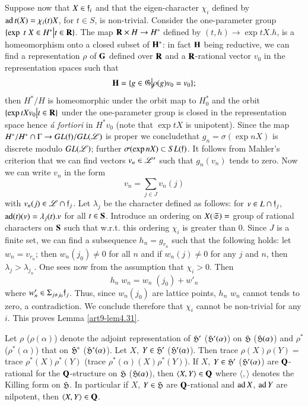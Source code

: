 \subsection{}\label{art9-subsec4.33}
Suppose now that $X \in \mathfrak{f}_i$ and that the eigen-character $\chi_i$ defined by $\operatorname{ad} t (X) = \chi_i(t) X$, for $t \in S$, is non-trivial. Consider the one-parameter group $\{\exp \; t\; X \in H^\ast \big| t \in \mathbf{R}\}$. The map $\mathbf{R} \times H \to H^\ast$ defined by $(t, h) \to \exp t X. h$, is a homeomorphism onto a closed subset of $\mathbf{H}^\ast$: in fact $\mathbf{H}$ being reductive, we can find a representation $\rho$ of $\mathbf{G}$ defined over $\mathbf{R}$ and a $\mathbf{R}$-rational vector $v_0$ in the representation spaces such that 
$$
\mathbf{H} = \{g \in \mathfrak{G} \big| \rho (g) v_0 = v_0\};
$$
then $H^\ast/ H$ is homeomorphic under the orbit map to $H^\ast_0$ and the orbit $\{\exp t X v_0 \big| t \in \mathbf{R}\}$ under the one-parameter group is closed in the representation space hence \textit{\'a fortiori} in $H^\ast v_0$  (note that $\exp t X$ is unipotent). Since the map $H^\ast/H^\ast \cap \Gamma \to G L (\mathfrak{f})/ GL (\mathscr{L})$ is proper we conclude\pageoriginale that $g_n = \sigma (\exp n X)$ is discrete modulo $GL(\mathscr{L})$; further $\sigma (\exp n X) \subset SL (\mathfrak{f})$. It follows from Mahler's criterion that we can find vectors $v_n \in \mathscr{L}'$ such that $g_n (v_n)$ tends to zero. Now we can write $v_n$ in the form
$$
v_n = \sum\limits_{j \in J} v_n (j)
$$
with $v_n(j) \in \mathscr{L} \cap \mathfrak{f}_j$. Let $\lambda_j$ be the character defined as follows: for $v \in L \cap \mathfrak{f}_j$, $\operatorname{ad} (t) (v) = \lambda_j (t).v$ for all $t \in \mathbf{S}$. Introduce an ordering on $X (\mathfrak{S}) =$ group of rational characters on $\mathbf{S}$ such that w.r.t. this ordering $\chi_i$ is greater than 0. Since $J$ is a finite set, we can find a subsequence $h_n = g_{r_n}$ such that the following holds: let $w_n = v_{r_n}$; then $w_n (j_0) \neq 0 $ for all $n$ and if $w_n (j)\neq 0$ for any $j$ and $n$, then $\lambda_j > \lambda_{j_n}$. One sees now from the assumption that $\chi_i >0$. Then 
$$
h_n \;w_n = w_n \;(j_0) + w'_n
$$
where $w'_n \in \Sigma_{j \neq j_0} \mathfrak{f}_j$. Thus, since $w_n (j_0)$ are lattice points, $h_n$ $w_n$ cannot tends to zero, a contradiction. We conclude therefore that $\chi_i$ cannot be non-trivial for any $i$. This proves Lemma \ref{art9-lem4.31}.

\setcounter{definition}{33}
\begin{coro}\label{art9-coro4.34}
Let $\rho$ (\resp $\rho (\alpha)$) denote the adjoint representation of $\mathfrak{H}'$ (\resp $\mathfrak{H}' (\alpha)$) on $\mathfrak{H}$ (\resp $\mathfrak{H}(\alpha)$) and $\rho^\ast$ (\resp $\rho^\ast (\alpha)$) that on $\mathfrak{H}^\ast$ (\resp $\mathfrak{H}^\ast(\alpha)$). Let $X$, $Y \in \mathfrak{H}'$ (\resp $\mathfrak{H}'(\alpha)$). Then trace $\rho (X) \rho (Y)=$ trace $\rho^\ast (X) \rho^\ast (Y)$ (\resp trace $\rho^\ast (\alpha) (X) \rho^\ast (Y)$). If $X$, $Y \in \mathfrak{H}'$ (\resp $\mathfrak{H}'(\alpha)$) are $\mathbf{Q}$-rational for the $\mathbf{Q}$-structure on $\mathfrak{H}$ (\resp $\mathfrak{H} (\alpha)$), then $\langle X,Y \rangle \in \mathbf{Q}$ where $\langle ,\rangle$ denotes the Killing form on $\mathfrak{H}$. In particular if $X$, $Y \in\mathfrak{H}$ are $\mathbf{Q}$-rational and $\operatorname{ad} X$, $\operatorname{ad} Y$ are nilpotent, then $\langle X, Y \rangle \in\mathbf{Q}$.
\end{coro}

